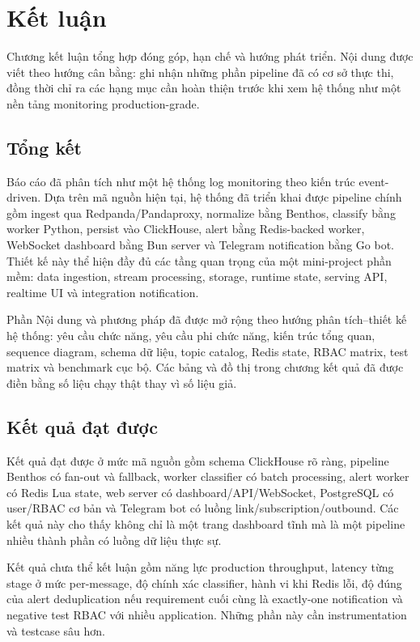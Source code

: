 \chapter{Kết luận}

Chương kết luận tổng hợp đóng góp, hạn chế và hướng phát triển. Nội dung được viết theo hướng cân bằng: ghi nhận những phần pipeline đã có cơ sở thực thi, đồng thời chỉ ra các hạng mục cần hoàn thiện trước khi xem hệ thống như một nền tảng monitoring production-grade.

\section{Tổng kết}

Báo cáo đã phân tích \LogRider{} như một hệ thống log monitoring theo kiến trúc event-driven. Dựa trên mã nguồn hiện tại, hệ thống đã triển khai được pipeline chính gồm ingest qua Redpanda/Pandaproxy, normalize bằng Benthos, classify bằng worker Python, persist vào ClickHouse, alert bằng Redis-backed worker, WebSocket dashboard bằng Bun server và Telegram notification bằng Go bot. Thiết kế này thể hiện đầy đủ các tầng quan trọng của một mini-project phần mềm: data ingestion, stream processing, storage, runtime state, serving API, realtime UI và integration notification.

Phần Nội dung và phương pháp đã được mở rộng theo hướng phân tích--thiết kế hệ thống: yêu cầu chức năng, yêu cầu phi chức năng, kiến trúc tổng quan, sequence diagram, schema dữ liệu, topic catalog, Redis state, RBAC matrix, test matrix và benchmark cục bộ. Các bảng và đồ thị trong chương kết quả đã được điền bằng số liệu chạy thật thay vì số liệu giả.

\section{Kết quả đạt được}

Kết quả đạt được ở mức mã nguồn gồm schema ClickHouse rõ ràng, pipeline Benthos có fan-out và fallback, worker classifier có batch processing, alert worker có Redis Lua state, web server có dashboard/API/WebSocket, PostgreSQL có user/RBAC cơ bản và Telegram bot có luồng link/subscription/outbound. Các kết quả này cho thấy \LogRider{} không chỉ là một trang dashboard tĩnh mà là một pipeline nhiều thành phần có luồng dữ liệu thực sự.

Kết quả chưa thể kết luận gồm năng lực production throughput, latency từng stage ở mức per-message, độ chính xác classifier, hành vi khi Redis lỗi, độ đúng của alert deduplication nếu requirement cuối cùng là exactly-one notification và negative test RBAC với nhiều application. Những phần này cần instrumentation và testcase sâu hơn.

